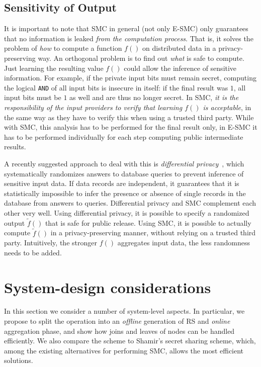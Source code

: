 \documentclass{sig-alternate}
\begin{document}
\subsection{Sensitivity of Output}
It is important to note that SMC in general (not only E-SMC) only guarantees that no information is leaked \emph{from the computation process}. 
That is, it solves the problem of \emph{how} to compute a function $f()$ on distributed data in a privacy-preserving way. 
An orthogonal problem is to find out \emph{what} is safe to compute.
Just learning the resulting value $f()$ could allow the inference of sensitive information.
For example, if the private input bits must remain secret, computing the logical \texttt{AND} of all
input bits is insecure in itself: if the final result was $1$, all input bits must be $1$ as well and are thus no longer secret.
In SMC, \emph{it is the responsibility of the input providers to verify that learning $f()$ is acceptable}, 
in the same way as they have to verify this when using a trusted third party.
While with SMC, this analysis has to be performed for the final result only, in E-SMC it has to be
performed individually for each step computing public intermediate results.

A recently suggested approach to deal with this is \emph{differential privacy}~\cite{dwork2008differential,differentialPrivacy2010}, 
which systematically randomizes answers to database queries to prevent inference of sensitive input data.
If data records are independent, it guarantees that it is statistically impossible to infer the presence or absence of 
single records in the database from answers to queries.
Differential privacy and SMC complement each other very well. Using differential privacy, it is possible to 
specify a randomized output $\widetilde{f}()$ that is safe for public release. Using SMC,
it is possible to actually compute $\widetilde{f}()$ in a privacy-preserving manner, without relying on a trusted third party.
Intuitively, the stronger $f()$ aggregates input data, the less randomness needs to be added.


\section{System-design considerations}\label{sec:design}


In this section we consider a number of system-level aspects. In particular, 
we propose to split the \ata operation into an \emph{offline} generation of RS and \emph{online} aggregation phase, and show how joins and leaves of nodes can be  handled efficiently.
We also compare the \ata scheme to Shamir's secret sharing scheme, which, among the existing alternatives for performing SMC, allows the most efficient solutions.
\end{document}

